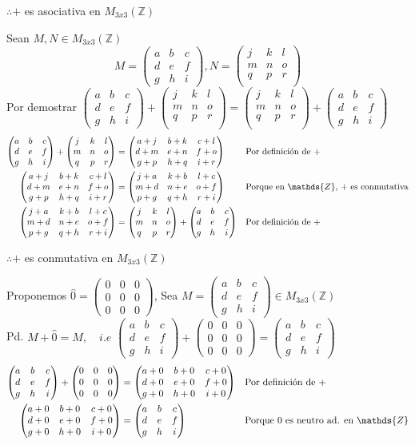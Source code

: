 \documentclass[letterpaper]{article}
\newcommand{\Ceros}{\begin{pmatrix}
		0 & 0 & 0\\
		0 & 0 & 0\\
		0 & 0 & 0 
\end{pmatrix}}
\newcommand{\Nmat}{\begin{pmatrix}
		j & k & l\\
		m & n & o\\
		q & p & r\\
\end{pmatrix}}
\newcommand{\Mmat}{\begin{pmatrix}
		a & b & c\\
		d & e & f\\
		g & h & i
\end{pmatrix}}
\newcommand{\mtt}{M_{3x3}(\mathds{Z})}
\newcommand{\Z}{\mathds{Z}}
\renewcommand{\*}{\cdot}
\theoremstyle{definition}
\begin{document}
\begin{center}
	$ \therefore +$ es asociativa en $ \mtt $
\end{center}
Sean $ M, N \in \mtt $
$$ M = \Mmat, N = \Nmat $$ Por demostrar $ \Mmat + \Nmat = \Nmat + \Mmat $
\begin{align*}
	\Mmat + \Nmat &= \begin{pmatrix}
	a + j & b+k & c+ l\\
	d+m & e+n & f+o\\
	g+p & h+q & i+r 
	\end{pmatrix} && \text{Por definición de +}\\
	\begin{pmatrix}
	a + j & b+k & c+ l\\
	d+m & e+n & f+o\\
	g+p & h+q & i+r 
	\end{pmatrix} & = \begin{pmatrix}
	j+a & k+b & l+c\\
	m+d & n+e & o+f\\
	p+g & q+h & r+i 
	\end{pmatrix} && \text{Porque en $ \Z$, + es conmutativa}\\
	\begin{pmatrix}
	j+a & k+b & l+c\\
	m+d & n+e & o+f\\
	p+g & q+h & r+i 
	\end{pmatrix} &= \Nmat + \Mmat &&  \text{Por definición de +}
\end{align*}
\begin{center}
	$ \therefore + $ es conmutativa en $ \mtt $
\end{center}
Proponemos $ \hat{0} = \begin{pmatrix}
0 & 0 & 0\\
0 & 0 & 0\\
0 & 0 & 0 
\end{pmatrix} $, 
Sea $ M = \Mmat \in \mtt $\\
Pd. $ M + \hat{0} = M, \quad i.e $ $ \Mmat + \Ceros = \Mmat $
\begin{align*}
	\Mmat + \Ceros & = \begin{pmatrix}
	a+0 & b+0 & c+0\\
	d+0 & e+0 & f+0\\
	g+0 & h+0 & i+0 
	\end{pmatrix} && \text{Por definición de +}\\
	\begin{pmatrix}
	a+0 & b+0 & c+0\\
	d+0 & e+0 & f+0\\
	g+0 & h+0 & i+0 
	\end{pmatrix} & = \Mmat && \text{Porque 0 es neutro ad. en $ \Z $}
\end{align*}
\end{document}
